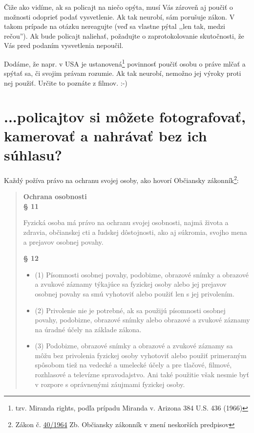 \documentclass[openany]{book}
\begin{document}
Čiže ako vidíme, ak sa policajt na niečo opýta, musí Vás zároveň aj poučiť o možnosti odoprieť podať vysvetlenie. Ak tak neurobí, sám porušuje zákon. V takom prípade na otázku nereagujte (veď sa vlastne pýtal ,,len tak, medzi rečou''). Ak bude policajt naliehať, požadujte o zaprotokolovanie skutočnosti, že Vás pred podaním vysvetlenia nepoučil.

Dodáme, že napr. v USA je ustanovená\footnote{tzv. Miranda rights, podľa prípadu Miranda v. Arizona 384 U.S. 436 (1966)}  povinnosť poučiť osobu o práve mlčať a spýtať sa, či svojim právam rozumie. Ak tak neurobí, nemožno jej výroky proti nej použiť. Určite to poznáte z filmov. :-)



\section*{...policajtov si môžete fotografovať, kamerovať a nahrávať bez ich súhlasu?}

Každý požíva právo na ochranu svojej osoby, ako hovorí Občiansky zákonník\footnote{Zákon č. \href{http://jaspi.justice.gov.sk/jaspiw1/index_jaspi0.asp?MOD=html&FIR=demo&JEL=n&AGE=zak&IDC=40/1964}{40/1964} Zb. Občiansky zákonník v znení neskorších predpisov}: 

\begin{quote}
\textbf{Ochrana osobnosti\\
§ 11}

Fyzická osoba má právo na ochranu svojej osobnosti, najmä života a zdravia, občianskej cti a ľudskej dôstojnosti, ako aj súkromia, svojho mena a prejavov osobnej povahy.

\textbf{§ 12}
\begin{itemize}
\item[] (1) Písomnosti osobnej povahy, podobizne, obrazové snímky a obrazové a zvukové záznamy týkajúce sa fyzickej osoby alebo jej prejavov osobnej povahy sa smú vyhotoviť alebo použiť len s jej privolením.

\item (2) Privolenie nie je potrebné, ak sa použijú písomnosti osobnej povahy, podobizne, obrazové snímky alebo obrazové a zvukové záznamy na úradné účely na základe zákona.

\item (3) Podobizne, obrazové snímky a obrazové a zvukové záznamy sa môžu bez privolenia fyzickej osoby vyhotoviť alebo použiť primeraným spôsobom tiež na vedecké a umelecké účely a pre tlačové, filmové, rozhlasové a televízne spravodajstvo. Ani také použitie však nesmie byť v rozpore s oprávnenými záujmami fyzickej osoby.
\end{itemize}
\end{quote}
\end{document}
